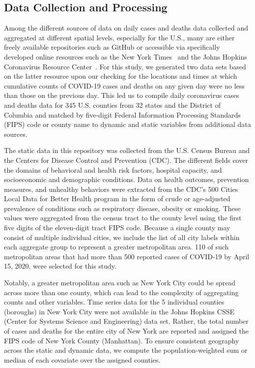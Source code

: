 \documentclass[a4paper, inpress]{jds} %
\renewcommand{\_}{%
    \textunderscore\hspace{0pt}%
}
\begin{document}
\subsection{Data Collection and Processing}

Among the different sources of data on daily cases and deaths data
collected and aggregated at different spatial levels, especially for
the U.S., many are either freely available repositories such as GitHub
or accessible via specifically developed online resources such as the
New York Times~\citep{github-nytimes} and the Johns Hopkins
Coronavirus Resource Center~\citep{www-jh-covid19}.  For this study,
we generated two data sets based on the latter resource upon our
checking for the locations and times at which cumulative counts of
COVID-19 cases and deaths on any given day were no less than those on
the previous day. This led us to compile daily coronavirus cases and
deaths data for 345 U.S. counties from 32 states and the District of
Columbia and matched by five-digit Federal Information Processing
Standards (FIPS) code or county name to dynamic and static variables
from additional data sources.

The static data in this repository was collected from the U.S. Census
Bureau and the Centers for Disease Control and Prevention (CDC). The
different fields cover the domains of behavioral and health risk
factors, hospital capacity, and socioeconomic and demographic
conditions. Data on health outcomes, prevention measures, and
unhealthy behaviors were extracted from the CDC's 500 Cities Local
Data for Better Health program \citep{www-cdc-chronic-data} in the form
of crude or age-adjusted prevalence of conditions such as respiratory
disease, obesity or smoking. These values were aggregated from the
census tract to the county level using the first five digits of the
eleven-digit tract FIPS code. Because a single county may consist of
multiple individual cities, we include the list of all city labels
within each aggregate group to represent a greater metropolitan
area. 110 of such metropolitan areas that had more than 500 reported
cases of COVID-19 by April 15, 2020, were selected for this study.

Notably, a greater metropolitan area such as New York City could be
spread across more than one county, which can lead to the complexity
of aggregating counts and other variables. Time series data for the 5
individual counties (boroughs) in New York City were not available in
the Johns Hopkins CSSE (Center for Systems Science and Engineering)
data set. Rather, the total number of cases and deaths for the entire
city of New York are reported and assigned the FIPS code of New York
County (Manhattan). To ensure consistent geography across the static
and dynamic data, we compute the population-weighted sum or median of
each covariate over the assigned counties.
\end{document}
